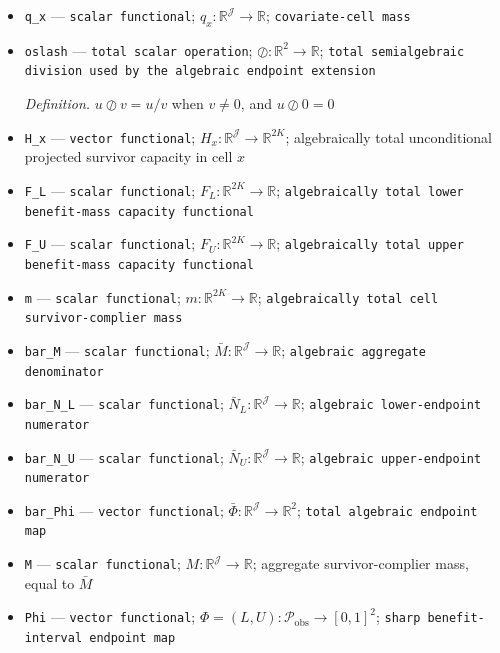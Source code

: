 \documentclass{article}
\begin{document}
\begin{itemize}
  \item \texttt{q\_\allowbreak{}x} --- \texttt{scalar functional}; \(q_x:\mathbb R^{\mathcal J}\to\mathbb R\); \texttt{covariate-\allowbreak{}cell mass}
  \item \texttt{oslash} --- \texttt{total scalar operation}; \(\oslash:\mathbb R^2\to\mathbb R\); \texttt{total semialgebraic division used by the algebraic endpoint extension}
  \par\smallskip\noindent\emph{Definition.} \(u\oslash v=u/v\) when \(v\ne0\), and \(u\oslash0=0\)
  \item \texttt{H\_\allowbreak{}x} --- \texttt{vector functional}; \(H_x:\mathbb R^{\mathcal J}\to\mathbb R^{2K}\); algebraically total unconditional projected survivor capacity in cell \(x\)
  \item \texttt{F\_\allowbreak{}L} --- \texttt{scalar functional}; \(F_L:\mathbb R^{2K}\to\mathbb R\); \texttt{algebraically total lower benefit-\allowbreak{}mass capacity functional}
  \item \texttt{F\_\allowbreak{}U} --- \texttt{scalar functional}; \(F_U:\mathbb R^{2K}\to\mathbb R\); \texttt{algebraically total upper benefit-\allowbreak{}mass capacity functional}
  \item \texttt{m} --- \texttt{scalar functional}; \(m:\mathbb R^{2K}\to\mathbb R\); \texttt{algebraically total cell survivor-\allowbreak{}complier mass}
  \item \texttt{bar\_\allowbreak{}M} --- \texttt{scalar functional}; \(\bar M:\mathbb R^{\mathcal J}\to\mathbb R\); \texttt{algebraic aggregate denominator}
  \item \texttt{bar\_\allowbreak{}N\_\allowbreak{}L} --- \texttt{scalar functional}; \(\bar N_L:\mathbb R^{\mathcal J}\to\mathbb R\); \texttt{algebraic lower-\allowbreak{}endpoint numerator}
  \item \texttt{bar\_\allowbreak{}N\_\allowbreak{}U} --- \texttt{scalar functional}; \(\bar N_U:\mathbb R^{\mathcal J}\to\mathbb R\); \texttt{algebraic upper-\allowbreak{}endpoint numerator}
  \item \texttt{bar\_\allowbreak{}Phi} --- \texttt{vector functional}; \(\bar\Phi:\mathbb R^{\mathcal J}\to\mathbb R^2\); \texttt{total algebraic endpoint map}
  \item \texttt{M} --- \texttt{scalar functional}; \(M:\mathbb R^{\mathcal J}\to\mathbb R\); aggregate survivor-complier mass, equal to \(\bar M\)
  \item \texttt{Phi} --- \texttt{vector functional}; \(\Phi=(L,U):\mathcal P_{\mathrm{obs}}\to[0,1]^2\); \texttt{sharp benefit-\allowbreak{}interval endpoint map}

\end{itemize}
\end{document}
